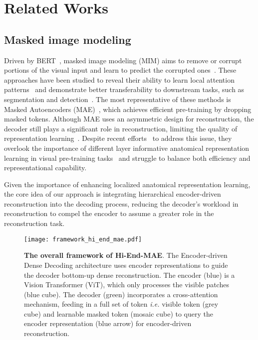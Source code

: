 \section{Related Works}
\subsection{Masked image modeling}
Driven by BERT~\citep{beit}, masked image modeling (MIM) aims to remove or corrupt portions of the visual input and learn to predict the corrupted ones~\citep{inpaint, simmim, mae, spark, highlevel, cae, peco}. These approaches have been studied to reveal their ability to learn local attention patterns~\citep{lowlevel} and demonstrate better transferability to downstream tasks, such as segmentation and detection~\citep{mae, simmim, cmae, spark, hyspark}. The most representative of these methods is Masked Autoencoders (MAE)~\citep{mae}, which achieves efficient pre-training by dropping masked tokens. Although MAE uses an asymmetric design for reconstruction, the decoder still plays a significant role in reconstruction, limiting the quality of representation learning~\citep{cae}. Despite recent efforts~\citep{cae, peco} to address this issue, they overlook the importance of different layer informative anatomical representation learning in visual pre-training tasks~\citep{spark, hyspark} and struggle to balance both efficiency and representational capability. 

Given the importance of enhancing localized anatomical representation learning, the core idea of our approach is integrating hierarchical encoder-driven reconstruction into the decoding process, reducing the decoder's workload in reconstruction to compel the encoder to assume a greater role in the reconstruction task.

\begin{figure*}[ht!]
    \centering
    \texttt{[image: framework\_hi\_end\_mae.pdf]}
    \vspace{-1mm}
    \caption{\textbf{The overall framework of Hi-End-MAE}. The Encoder-driven Dense Decoding architecture uses encoder representations to guide the decoder bottom-up dense reconstruction. The encoder (blue) is a Vision Transformer (ViT), which only processes the visible patches (blue cube). The decoder (green) incorporates a cross-attention mechanism, feeding in a full set of token \textit{i.e.} visible token (grey cube) and learnable masked token (mosaic cube) to query the encoder representation (blue arrow) for encoder-driven reconstruction.}
    \label{fig:framework}
    \vspace{-4mm}
\end{figure*}


